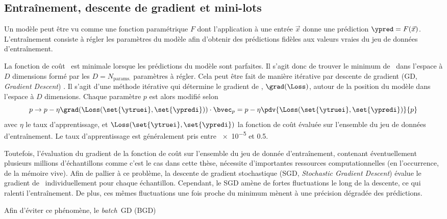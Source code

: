 \subsection{Entraînement, descente de gradient et mini-lots}\label{chapter-ML-section-gradient_descent}
Un modèle peut être vu comme une fonction paramétrique $F$
dont l'application à une entrée $\vec{x}$
donne une prédiction $\ypred=F(\vec{x})$.
L'entraînement consiste à régler les paramètres du modèle
afin d'obtenir des prédictions fidèles aux valeurs vraies du jeu de données d'entraînement.
\par
La fonction de coût \Loss\ est minimale lorsque les prédictions du modèle sont parfaites.
Il s'agit donc de trouver le minimum de \Loss\ dans l'espace à $D$ dimensions formé par les $D=N_\text{params.}$ paramètres à régler.
Cela peut être fait de manière itérative par descente de gradient (GD, \emph{Gradient Descent}) \cite{cauchy_1847}.
Il s'agit d'une méthode itérative qui détermine le gradient de \Loss, $\grad(\Loss)$, autour de la \og position \fg{} du modèle dans l'espace à $D$ dimensions.
Chaque paramètre $p$ est alors modifié selon
\begin{equation}
p \to p - \eta \grad(\Loss(\set{\ytruei}, \set{\ypredi})) \cdot \bvec_p = p - \eta \pdv{\Loss(\set{\ytruei}, \set{\ypredi})}{p}
\end{equation}
avec $\eta$ le taux d'apprentissage,
et
$\Loss(\set{\ytruei}, \set{\ypredi})$
la fonction de coût évaluée sur l'ensemble du jeu de données d'entraînement.
Le taux d'apprentissage est généralement pris entre \num{e-5} et \num{0.5}.
\par
Toutefois, l'évaluation du gradient de la fonction de coût sur l'ensemble du jeu de donnée d'entraînement,
contenant éventuellement plusieurs millions d'échantillons comme c'est le cas dans cette thèse,
nécessite d'importantes ressources computationnelles (en l'occurrence, de la mémoire vive).
Afin de pallier à ce problème,
la descente de gradient stochastique (SGD, \emph{Stochastic Gradient Descent})
évalue le gradient de \Loss\ individuellement pour chaque échantillon.
Cependant, le SGD amène de fortes fluctuations le long de la descente,
ce qui ralenti l'entraînement.
De plus, ces mêmes fluctuations une fois proche du minimum mènent à une précision dégradée des prédictions.
\par
Afin d'éviter ce phénomène,
le \emph{batch}~GD (BGD) \cite{SGD}
